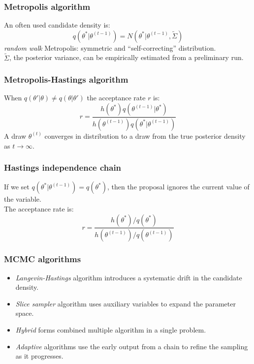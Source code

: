 \documentclass{beamer}
\newcommand{\1}{\ensuremath{\mathbf{1}}}
\begin{document}
%
%
%
\begin{frame}\frametitle{Metropolis algorithm}
	An often used candidate density is:
	\begin{equation}
		q(\theta^*|\theta^{(t-1)}) = N(\theta^*|\theta^{(t-1)},\tilde{\Sigma})
	\end{equation}
	\emph{random walk} Metropolis: symmetric and ``self-correcting'' distribution.\\[2ex]
	$\tilde{\Sigma}$, the posterior variance, can be empirically estimated from a preliminary run.
\end{frame}
%
%
%
\begin{frame}\frametitle{Metropolis-Hastings algorithm}
	When $q(\theta'|\theta) \neq q(\theta|\theta')$ the acceptance rate $r$ is:
	\begin{equation}
		r = \frac{h(\theta^*)q(\theta^{(t-1)}|\theta^*)}{h(\theta^{(t-1)})q(\theta^*|\theta^{(t-1)})}
	\end{equation}
	A draw $\theta^{(t)}$ converges in distribution to a draw from the true posterior density as $t \to \infty$.
\end{frame}
%
%
%
\begin{frame}\frametitle{Hastings independence chain}
	If we set $q(\theta^*|\theta^{(t-1)}) = q(\theta^*)$, then the proposal ignores the current value of the variable.\\[2ex]
	The acceptance rate is:
	\begin{equation}
		r = \frac{h(\theta^*)/q(\theta^*)}{h(\theta^{(t-1)})/q(\theta^{(t-1)})}
	\end{equation}		
\end{frame}
%
%
%
\begin{frame}\frametitle{MCMC algorithms}
	\begin{itemize}
		\item \emph{Langevin-Hastings} algorithm introduces a systematic drift in the candidate density.
		\item \emph{Slice sampler} algorithm uses auxiliary variables to expand the parameter space.
		\item \emph{Hybrid} forms combined multiple algorithm in a single problem.
		\item \emph{Adaptive} algorithms use the early output from a chain to refine the sampling as it progresses.
	\end{itemize}
\end{frame}
\end{document}
